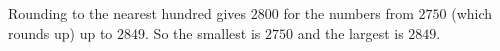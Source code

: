 Rounding to the nearest hundred gives $2800$ for the numbers from $2750$ (which rounds up) up to $2849$. So the smallest is $\boxed{2750}$ and the largest is $\boxed{2849}$.
